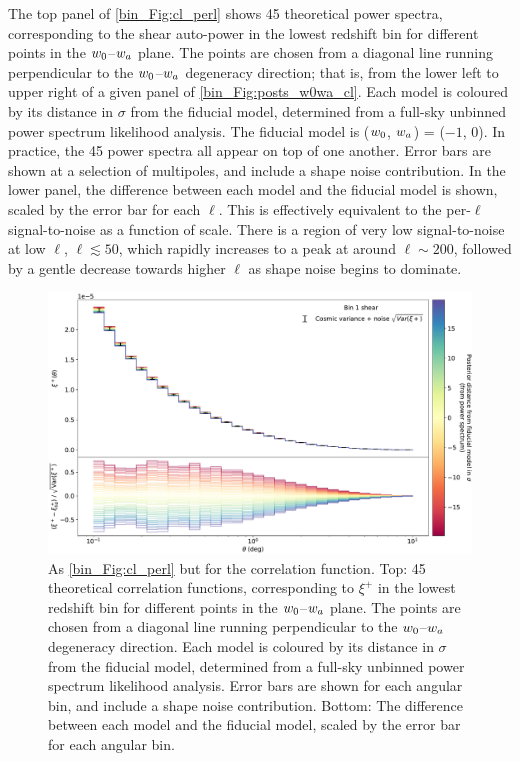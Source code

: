 The top panel of \autoref{bin_Fig:cl_perl} shows 45 theoretical power spectra, corresponding to the shear auto-power in the lowest redshift bin for different points in the $w_0$--$w_a$ plane. The points are chosen from a diagonal line running perpendicular to the $w_0$--$w_a$ degeneracy direction; that is, from the lower left to upper right of a given panel of \autoref{bin_Fig:posts_w0wa_cl}. Each model is coloured by its distance in $\sigma$ from the fiducial model, determined from a full-sky unbinned power spectrum likelihood analysis. The fiducial model is ($w_0$, $w_a$) = ($-1$, $0$). In practice, the 45 power spectra all appear on top of one another. Error bars are shown at a selection of multipoles, and include a shape noise contribution. In the lower panel, the difference between each model and the fiducial model is shown, scaled by the error bar for each $\ell$. This is effectively equivalent to the per-$\ell$ signal-to-noise as a function of scale. There is a region of very low signal-to-noise at low $\ell$, $\ell \lesssim 50$, which rapidly increases to a peak at around $\ell \sim 200$, followed by a gentle decrease towards higher $\ell$ as shape noise begins to dominate.

\begin{figure}[t]
\includegraphics[width=\textwidth]{cf_perbin}
\caption{As \autoref{bin_Fig:cl_perl} but for the correlation function. Top: 45 theoretical correlation functions, corresponding to $\xi^+$ in the lowest redshift bin for different points in the $w_0$--$w_a$ plane. The points are chosen from a diagonal line running perpendicular to the $w_0$--$w_a$ degeneracy direction. Each model is coloured by its distance in $\sigma$ from the fiducial model, determined from a full-sky unbinned power spectrum likelihood analysis. Error bars are shown for each angular bin, and include a shape noise contribution. Bottom: The difference between each model and the fiducial model, scaled by the error bar for each angular bin.}
\label{bin_Fig:cf_perbin}
\end{figure}

